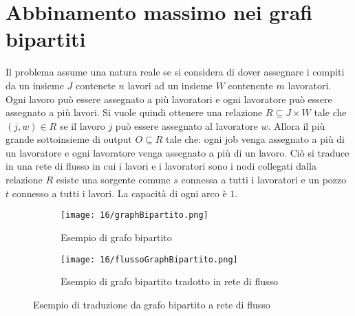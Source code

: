 \section{Abbinamento massimo nei grafi bipartiti}
    Il problema assume una natura reale se si considera di dover assegnare i compiti da un insieme $J$ contenete $n$ lavori ad un insieme $W$ contenente $m$ lavoratori. Ogni lavoro può essere assegnato a più lavoratori e ogni lavoratore può essere assegnato a più lavori. Si vuole quindi ottenere una relazione $R\subseteq J\times W $ tale che $(j,w)\in R$ se il lavoro $j$ può essere assegnato al lavoratore $w$. Allora il più grande sottoinsieme di output $O\subseteq R$ tale che: ogni job venga assegnato a più di un lavoratore e ogni lavoratore venga assegnato a più di un lavoro. Ciò si traduce in una rete di flusso in cui i lavori e i lavoratori sono i nodi collegati dalla relazione $R$ esiste una sorgente comune $s$ connessa a tutti i lavoratori e un pozzo $t$ connesso a tutti i lavori. La capacità di ogni arco è $1$.
    \begin{figure}[H]
        \centering
        \begin{subfigure}{0.45\textwidth}
            \centering
            \texttt{[image: 16/graphBipartito.png]}
            \caption{Esempio di grafo bipartito}
        \end{subfigure}
        \begin{subfigure}{0.45\textwidth}
            \texttt{[image: 16/flussoGraphBipartito.png]}
            \caption{Esempio di grafo bipartito tradotto in rete di flusso}
        \end{subfigure}
        \caption{Esempio di traduzione da grafo bipartito a rete di flusso}
    \end{figure}